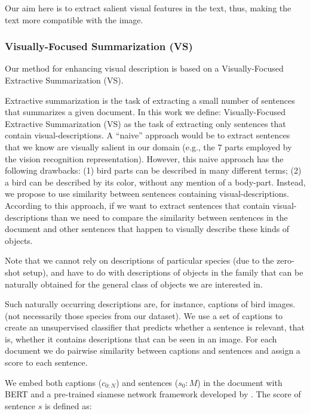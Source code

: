\documentclass[11pt,a4paper]{article}
\begin{document}
Our aim here is to extract salient visual features in the text, thus, making the text more compatible with the image. 

 \par
 
\subsubsection{Visually-Focused Summarization (VS)}


Our method for enhancing visual description is based on a Visually-Focused Extractive Summarization (VS).

Extractive summarization is the task of extracting a small number of sentences that summarizes a given document.
In this work we define: Visually-Focused Extractive Summarization (VS) as the task of extracting only sentences that contain visual-descriptions. A \enquote{naive} approach would be to extract sentences that we know are visually salient in our domain (e.g., the 7 parts employed by the vision recognition representation).  However, this naive approach has the following drawbacks: (1) bird parts can be described in many different terms; (2) a bird can be described by its color, without any mention of a body-part. 
Instead, we propose to use similarity between sentences containing visual-descriptions. According to this approach, if we want to extract sentences that contain visual-descriptions than we need to compare the similarity between sentences in the document and other sentences that happen to visually describe these kinds of objects. 
\par
Note that we cannot rely on descriptions of particular species (due to the zero-shot setup), and have to do with descriptions of objects in the family that can be naturally obtained for the general class of objects we are interested in.\par

Such naturally occurring descriptions are, for instance, captions of bird images. (not necessarily those species from our dataset). We use a set of captions to create an unsupervised classifier that predicts whether a sentence is relevant, that is, whether it contains descriptions that can be seen in an image.
For each document we do pairwise similarity between captions and sentences and assign a score to each sentence.

We embed both captions ($c_{0:N}$) and sentences ($s_0:M$) in the document with BERT \cite{devlin2019bert} and a pre-trained siamese network framework developed by \citet{reimers2019sentence}. The score of sentence $s$ is defined as:
\end{document}
